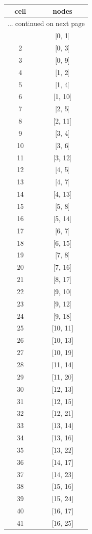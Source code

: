 \documentclass{article}%
\begin{document}
\begin{longtable}{| c | c |}%
\hline%
cell&nodes\\%
\hline%
\endhead%
\hline%
\multicolumn{2}{r}{... continued on next page}\\%
\endfoot%
\hline%
\endlastfoot%
1&{[}0, 1{]}\\%
2&{[}0, 3{]}\\%
3&{[}0, 9{]}\\%
4&{[}1, 2{]}\\%
5&{[}1, 4{]}\\%
6&{[}1, 10{]}\\%
7&{[}2, 5{]}\\%
8&{[}2, 11{]}\\%
9&{[}3, 4{]}\\%
10&{[}3, 6{]}\\%
11&{[}3, 12{]}\\%
12&{[}4, 5{]}\\%
13&{[}4, 7{]}\\%
14&{[}4, 13{]}\\%
15&{[}5, 8{]}\\%
16&{[}5, 14{]}\\%
17&{[}6, 7{]}\\%
18&{[}6, 15{]}\\%
19&{[}7, 8{]}\\%
20&{[}7, 16{]}\\%
21&{[}8, 17{]}\\%
22&{[}9, 10{]}\\%
23&{[}9, 12{]}\\%
24&{[}9, 18{]}\\%
25&{[}10, 11{]}\\%
26&{[}10, 13{]}\\%
27&{[}10, 19{]}\\%
28&{[}11, 14{]}\\%
29&{[}11, 20{]}\\%
30&{[}12, 13{]}\\%
31&{[}12, 15{]}\\%
32&{[}12, 21{]}\\%
33&{[}13, 14{]}\\%
34&{[}13, 16{]}\\%
35&{[}13, 22{]}\\%
36&{[}14, 17{]}\\%
37&{[}14, 23{]}\\%
38&{[}15, 16{]}\\%
39&{[}15, 24{]}\\%
40&{[}16, 17{]}\\%
41&{[}16, 25{]}\\%

\end{longtable}
\end{document}
